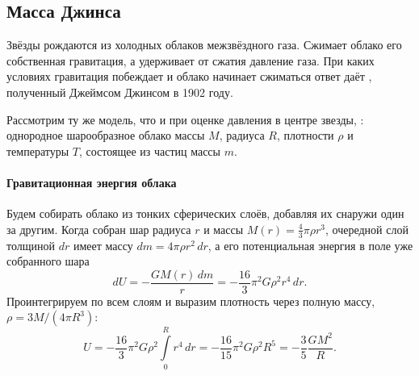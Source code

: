 \subsection{Масса Джинса}
\label{sec:jeans-mass}
Звёзды рождаются из холодных облаков межзвёздного газа. Сжимает облако его собственная гравитация, а удерживает от сжатия давление газа. При каких условиях гравитация побеждает и облако начинает сжиматься ответ даёт , полученный Джеймсом Джинсом в 1902 году.

Рассмотрим ту же модель, что и при оценке давления в центре звезды, : однородное шарообразное облако массы $M$, радиуса $R$, плотности $\rho$ и температуры $T$, состоящее из частиц массы $m$.

\paragraph{Гравитационная энергия облака} Будем собирать облако из тонких сферических слоёв, добавляя их снаружи один за другим. Когда собран шар радиуса $r$ и массы $M(r) = \frac{4}{3}\pi\rho r^3$, очередной слой толщиной $dr$ имеет массу $dm = 4\pi\rho r^2\,dr$, а его потенциальная энергия в поле уже собранного шара
\begin{equation*}
    dU = -\frac{G M(r)\,dm}{r} = -\frac{16}{3}\pi^2 G \rho^2 r^4\,dr.
\end{equation*}
Проинтегрируем по всем слоям и выразим плотность через полную массу, $\rho = 3M / (4\pi R^3)$:
\begin{equation}
    U = -\frac{16}{3}\pi^2 G \rho^2 \int\limits_0^R r^4\,dr
      = -\frac{16}{15}\pi^2 G \rho^2 R^5
      = -\frac{3}{5}\frac{GM^2}{R}.
    \label{eq:sphere-grav-energy}
\end{equation}

